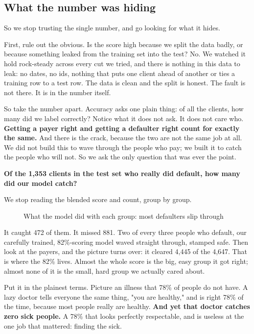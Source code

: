 \documentclass[11pt]{article} %
\begin{document}
\subsection{What the number was hiding}


So we stop trusting the single number, and go looking for what it hides.

First, rule out the obvious. Is the score high because we split the data badly, or because something leaked from the training set into the test? No. We watched it hold rock-steady across every cut we tried, and there is nothing in this data to leak: no dates, no ids, nothing that puts one client ahead of another or ties a training row to a test row. The data is clean and the split is honest. The fault is not there. It is in the number itself.

So take the number apart. Accuracy asks one plain thing: of all the clients, how many did we label correctly? Notice what it does not ask. It does not care who. \textbf{Getting a payer right and getting a defaulter right count for exactly the same.} And there is the crack, because the two are not the same job at all. We did not build this to wave through the people who pay; we built it to catch the people who will not. So we ask the only question that was ever the point.

\textbf{Of the 1,353 clients in the test set who really did default, how many did our model catch?}

We stop reading the blended score and count, group by group.

\begin{figure}[htbp]
\centering

\caption{What the model did with each group: most defaulters slip through}
\end{figure}


It caught 472 of them. It missed 881. Two of every three people who default, our carefully trained, 82\%-scoring model waved straight through, stamped safe. Then look at the payers, and the picture turns over: it cleared 4,445 of the 4,647. That is where the 82\% lives. Almost the whole score is the big, easy group it got right; almost none of it is the small, hard group we actually cared about.

Put it in the plainest terms. Picture an illness that 78\% of people do not have. A lazy doctor tells everyone the same thing, "you are healthy," and is right 78\% of the time, because most people really are healthy. \textbf{And yet that doctor catches zero sick people.} A 78\% that looks perfectly respectable, and is useless at the one job that mattered: finding the sick.
\end{document}
